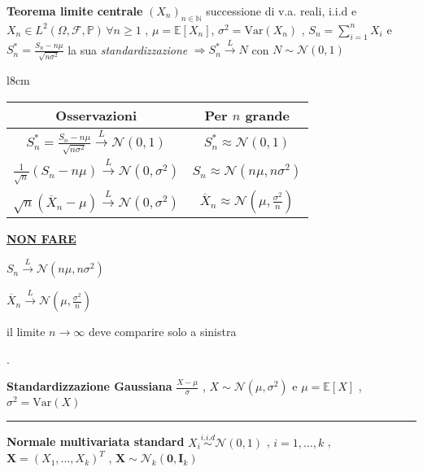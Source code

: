 \documentclass[openany]{book} %
\begin{document}
\textbf{Teorema limite centrale} $(X_n)_{n\in \mathbb{N}}$ successione di v.a. reali, i.i.d e $X_n\in L^2(\Omega,\mathcal{F},\mathbb{P})\,\forall n\geq 1$ , $\mu=\mathbb{E}[X_n]$, $\sigma^2=\text{Var}(X_n)$ , $S_n=\sum_{i=1}^nX_i$ e $S_n^*=\frac{S_n-n\mu}{\sqrt{n\sigma^2}}$ la sua \textit{standardizzazione} $\Rightarrow S_n^*\overset{L}{\rightarrow}N$ con $N\sim \mathcal{N}(0,1)$

\begin {wraptable}{l}{8cm}

\begin{tabular}{c|c}

	\textbf{Osservazioni}                                                             & Per $n$ grande                                             \\

	\hline

	$S_n^*=\frac{S_n-n\mu}{\sqrt{n\sigma^2}}\overset{L}{\rightarrow}\mathcal{N}(0,1)$ & $S_n^*\approx \mathcal{N}(0,1)$                            \\

	$\frac{1}{\sqrt{n}}(S_n-n\mu)\overset{L}{\rightarrow}\mathcal{N}(0,\sigma^2)$     & $S_n\approx \mathcal{N}(n\mu,n\sigma^2)$                   \\

	$\sqrt{n}(\overline X_n-\mu)\overset{L}{\rightarrow}\mathcal{N}(0,\sigma^2)$      & $\overline X_n\approx \mathcal{N}(\mu,\frac{\sigma^2}{n})$ \\
\end{tabular}

\end {wraptable}

\hfill

\hfill

\underline{\textbf{NON FARE}}

$S_n\overset{L}{\rightarrow}\mathcal{N}(n\mu,n\sigma^2)$

$\overline X_n \overset{L}{\rightarrow}\mathcal{N}(\mu,\frac{\sigma^2}{n})$

il limite $n \rightarrow \infty$ deve comparire solo a sinistra

.

\textbf{Standardizzazione Gaussiana} $\frac{X-\mu}{\sigma}$ , \quad$X\sim\mathcal{N}(\mu,\sigma^2)$ e $\mu = \mathbb{E}[X]$ , $\sigma^2=\text{Var}(X)$

\rule{\textwidth}{0.4pt}

\textbf{Normale multivariata standard} $X_i \overset{i.i.d}{\sim}\mathcal{N}(0,1)$ , $i=1,\dots,k$ , $\boldsymbol{X}=(X_1,\dots,X_k)^T$ , $\boldsymbol{X}\sim \mathcal{N}_k(\boldsymbol{0},\boldsymbol{I}_k)$
\end{document}
